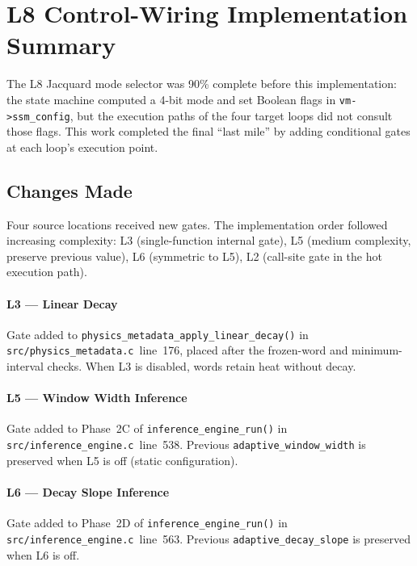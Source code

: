 
\section{L8 Control-Wiring Implementation Summary}
\label{sec:l8-wiring-summary}

The L8 Jacquard mode selector was 90\% complete before this implementation:
the state machine computed a 4-bit mode and set Boolean flags in
\texttt{vm->ssm\_config}, but the execution paths of the four target loops
did not consult those flags. This work completed the final ``last mile'' by
adding conditional gates at each loop's execution point.

\subsection{Changes Made}

Four source locations received new gates. The implementation order followed
increasing complexity: L3 (single-function internal gate), L5 (medium
complexity, preserve previous value), L6 (symmetric to L5), L2 (call-site
gate in the hot execution path).

\paragraph{L3 — Linear Decay} Gate added to
\texttt{physics\_metadata\_apply\_linear\_decay()} in
\texttt{src/physics\_metadata.c}~line~176, placed after the frozen-word and
minimum-interval checks. When L3 is disabled, words retain heat without decay.

\paragraph{L5 — Window Width Inference} Gate added to Phase~2C of
\texttt{inference\_engine\_run()} in \texttt{src/inference\_engine.c}~line~538.
Previous \texttt{adaptive\_window\_width} is preserved when L5 is off (static
configuration).

\paragraph{L6 — Decay Slope Inference} Gate added to Phase~2D of
\texttt{inference\_engine\_run()} in \texttt{src/inference\_engine.c}~line~563.
Previous \texttt{adaptive\_decay\_slope} is preserved when L6 is off.


